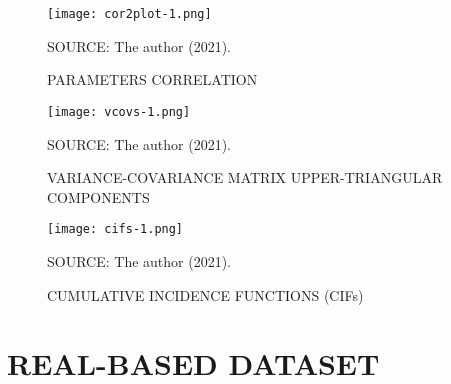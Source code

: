 \begin{figure}[H]
 \setlength{\abovecaptionskip}{.0001pt}
 \caption{PARAMETERS CORRELATION}
 \vspace{0.2cm}\centering
 \texttt{[image: cor2plot-1.png]}\\
 \begin{footnotesize}
  SOURCE: The author (2021).
 \end{footnotesize}
 \label{fig:cor2plot}
\end{figure}

\begin{figure}[H]
 \setlength{\abovecaptionskip}{.0001pt}
 \caption{VARIANCE-COVARIANCE MATRIX UPPER-TRIANGULAR COMPONENTS}
 \vspace{0.2cm}\centering
 \texttt{[image: vcovs-1.png]}\\
 \begin{footnotesize}
  SOURCE: The author (2021).
 \end{footnotesize}
 \label{fig:vcovs}
\end{figure}

\begin{figure}[H]
 \setlength{\abovecaptionskip}{.0001pt}
 \caption{CUMULATIVE INCIDENCE FUNCTIONS (CIFs)}
 \vspace{0.2cm}\centering
 \texttt{[image: cifs-1.png]}\\
 \begin{footnotesize}
  SOURCE: The author (2021).
 \end{footnotesize}
 \label{fig:cifs}
\end{figure}

\section{REAL-BASED DATASET}
\label{cap:datares}

